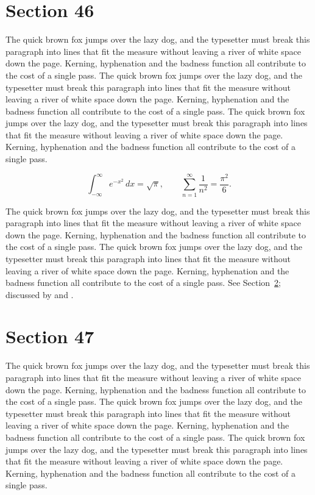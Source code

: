 \documentclass{article}
\begin{document}
\section{Section 46}
\label{sec:46}
The quick brown fox jumps over the lazy dog, and the typesetter must break this paragraph into lines that fit the measure without leaving a river of white space down the page. Kerning, hyphenation and the badness function all contribute to the cost of a single pass. The quick brown fox jumps over the lazy dog, and the typesetter must break this paragraph into lines that fit the measure without leaving a river of white space down the page. Kerning, hyphenation and the badness function all contribute to the cost of a single pass. The quick brown fox jumps over the lazy dog, and the typesetter must break this paragraph into lines that fit the measure without leaving a river of white space down the page. Kerning, hyphenation and the badness function all contribute to the cost of a single pass. 

\begin{equation}\label{eq:46}
\int_{-\infty}^{\infty} e^{-x^{2}}\,dx = \sqrt{\pi}, \qquad
\sum_{n=1}^{\infty} \frac{1}{n^{2}} = \frac{\pi^{2}}{6}.
\end{equation}

The quick brown fox jumps over the lazy dog, and the typesetter must break this paragraph into lines that fit the measure without leaving a river of white space down the page. Kerning, hyphenation and the badness function all contribute to the cost of a single pass. The quick brown fox jumps over the lazy dog, and the typesetter must break this paragraph into lines that fit the measure without leaving a river of white space down the page. Kerning, hyphenation and the badness function all contribute to the cost of a single pass. 
See Section~\ref{sec:47}; discussed by \textcite{k2} and \textcite{l4}.
\section{Section 47}
\label{sec:47}
The quick brown fox jumps over the lazy dog, and the typesetter must break this paragraph into lines that fit the measure without leaving a river of white space down the page. Kerning, hyphenation and the badness function all contribute to the cost of a single pass. The quick brown fox jumps over the lazy dog, and the typesetter must break this paragraph into lines that fit the measure without leaving a river of white space down the page. Kerning, hyphenation and the badness function all contribute to the cost of a single pass. The quick brown fox jumps over the lazy dog, and the typesetter must break this paragraph into lines that fit the measure without leaving a river of white space down the page. Kerning, hyphenation and the badness function all contribute to the cost of a single pass. 
\end{document}

